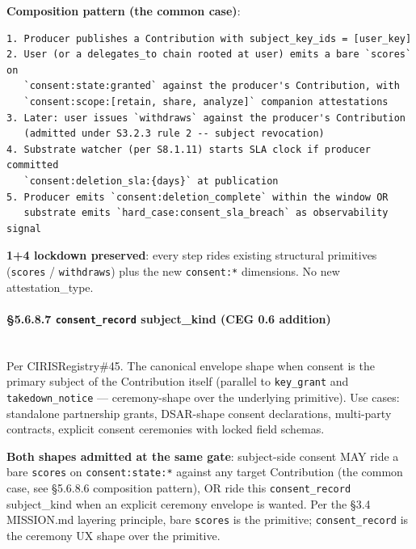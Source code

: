 \documentclass[10pt]{article}
\begin{document}
\textbf{Composition pattern (the common case)}:


\begin{lstlisting}
1. Producer publishes a Contribution with subject_key_ids = [user_key]
2. User (or a delegates_to chain rooted at user) emits a bare `scores` on
   `consent:state:granted` against the producer's Contribution, with
   `consent:scope:[retain, share, analyze]` companion attestations
3. Later: user issues `withdraws` against the producer's Contribution
   (admitted under S3.2.3 rule 2 -- subject revocation)
4. Substrate watcher (per S8.1.11) starts SLA clock if producer committed
   `consent:deletion_sla:{days}` at publication
5. Producer emits `consent:deletion_complete` within the window OR
   substrate emits `hard_case:consent_sla_breach` as observability signal
\end{lstlisting}

\textbf{1+4 lockdown preserved}: every step rides existing structural primitives (\texttt{scores} / \texttt{withdraws}) plus the new \texttt{consent:*} dimensions. No new attestation\_type.


\paragraph{§5.6.8.7 \texttt{consent\_record} subject\_kind (CEG 0.6 addition)}\mbox{}\\


Per CIRISRegistry\#45. The canonical envelope shape when consent is the primary subject of the Contribution itself (parallel to \texttt{key\_grant} and \texttt{takedown\_notice} — ceremony-shape over the underlying primitive). Use cases: standalone partnership grants, DSAR-shape consent declarations, multi-party contracts, explicit consent ceremonies with locked field schemas.


\textbf{Both shapes admitted at the same gate}: subject-side consent MAY ride a bare \texttt{scores} on \texttt{consent:state:*} against any target Contribution (the common case, see §5.6.8.6 composition pattern), OR ride this \texttt{consent\_record} subject\_kind when an explicit ceremony envelope is wanted. Per the §3.4 MISSION.md layering principle, bare \texttt{scores} is the primitive; \texttt{consent\_record} is the ceremony UX shape over the primitive.
\end{document}
